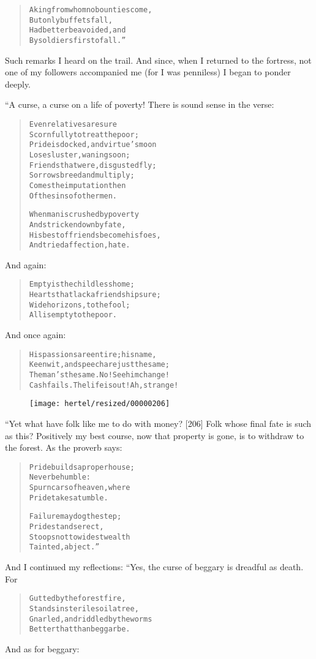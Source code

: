 \documentclass[article, twoside, 10pt]{memoir}
\renewenvironment{verbatim}{%
\begin{quote}%
\vskip -10pt%
\begin{alltt}\normalfont\small}{\end{alltt}%
\end{quote}%
\vskip -10pt
} %
\begin{document}
\begin{verbatim}
A king from whom no bounties come,
    But only buffets fall,
Had better be avoided, and
    By soldiers first of all.”
\end{verbatim}
Such remarks I heard on the trail. And since, when I returned to
the fortress, not one of my followers accompanied me (for I was
penniless) I began to ponder deeply.

“A curse, a curse on a life of poverty! There is sound sense in the
verse:

\begin{verbatim}
Even relatives are sure
Scornfully to treat the poor;
Pride is docked, and virtue's moon
Loses luster, waning soon;
Friends that were, disgusted fly;
Sorrows breed and multiply;
Comes the imputation then
Of the sins of other men.

When man is crushed by poverty
    And stricken down by fate,
His best of friends become his foes,
    And tried affection, hate.
\end{verbatim}
And again:

\begin{verbatim}
Empty is the childless home;
    Hearts that lack a friendship sure;
Wide horizons, to the fool;
    All is empty to the poor.
\end{verbatim}
And once again:

\begin{verbatim}
His passions are entire; his name,
Keen wit, and speech are just the same;
The man's the same. No! See him change!
Cash fails. The life is out! Ah, strange!
\end{verbatim}
\begin{figure}[p]\texttt{[image: hertel/resized/00000206]}\end{figure}“Yet what have folk like me to do with money? [206] Folk whose
final fate is such as this? Positively my best course, now that
property is gone, is to withdraw to the forest. As the proverb
says:

\begin{verbatim}
Pride builds a proper house;
    Never be humble:
Spurn cars of heaven, where
    Pride takes a tumble.

Failure may dog the step;
    Pride stands erect,
Stoops not to widest wealth
    Tainted, abject.”
\end{verbatim}
And I continued my reflections: “Yes, the curse of beggary is
dreadful as death. For

\begin{verbatim}
Gutted by the forest fire,
    Stands in sterile soil a tree,
Gnarled, and riddled by the worms{\textemdash}
    Better that than beggar be.
\end{verbatim}
And as for beggary:
\end{document}

